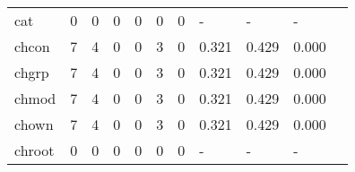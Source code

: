 \begin{longtable}{lp{1.2cm}p{1.2cm}p{1.2cm}p{1.2cm}p{1.2cm}p{1.2cm}p{1.2cm}p{1.2cm}p{1.2cm}p{1.2cm}}
cat       &                                     0 &                                                  0 &                                                0 &                                               0 &                                                0 &                                              0 &                                             - &                                                  - &                                                  - \\
chcon     &                                     7 &                                                  4 &                                                0 &                                               0 &                                                3 &                                              0 &                                         0.321 &                                              0.429 &                                              0.000 \\
chgrp     &                                     7 &                                                  4 &                                                0 &                                               0 &                                                3 &                                              0 &                                         0.321 &                                              0.429 &                                              0.000 \\
chmod     &                                     7 &                                                  4 &                                                0 &                                               0 &                                                3 &                                              0 &                                         0.321 &                                              0.429 &                                              0.000 \\
chown     &                                     7 &                                                  4 &                                                0 &                                               0 &                                                3 &                                              0 &                                         0.321 &                                              0.429 &                                              0.000 \\
chroot    &                                     0 &                                                  0 &                                                0 &                                               0 &                                                0 &                                              0 &                                             - &                                                  - &                                                  - \\

\end{longtable}
